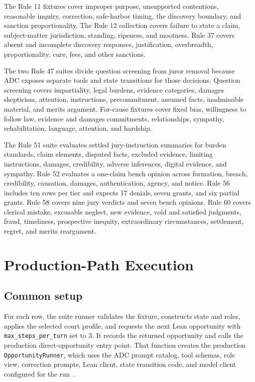 \documentclass[11pt]{article}
\newcommand{\code}[1]{\texttt{#1}}
\begin{document}
The Rule 11 fixtures cover improper purpose, unsupported contentions, reasonable inquiry, correction, safe-harbor timing, the discovery boundary, and sanction proportionality.  The Rule 12 collection covers failure to state a claim, subject-matter jurisdiction, standing, ripeness, and mootness.  Rule 37 covers absent and incomplete discovery responses, justification, overbreadth, proportionality, cure, fees, and other sanctions.

The two Rule 47 suites divide question screening from juror removal because ADC exposes separate tools and state transitions for those decisions.  Question screening covers impartiality, legal burdens, evidence categories, damages skepticism, attention, instructions, precommitment, assumed facts, inadmissible material, and merits argument.  For-cause fixtures cover fixed bias, willingness to follow law, evidence and damages commitments, relationships, sympathy, rehabilitation, language, attention, and hardship.

The Rule 51 suite evaluates settled jury-instruction summaries for burden standards, claim elements, disputed facts, excluded evidence, limiting instructions, damages, credibility, adverse inferences, digital evidence, and sympathy.  Rule 52 evaluates a one-claim bench opinion across formation, breach, credibility, causation, damages, authentication, agency, and notice.  Rule 56 includes ten rows per tier and expects 17 denials, seven grants, and six partial grants.  Rule 58 covers nine jury verdicts and seven bench opinions.  Rule 60 covers clerical mistake, excusable neglect, new evidence, void and satisfied judgments, fraud, timeliness, prospective inequity, extraordinary circumstances, settlement, regret, and merits reargument.

\section{Production-Path Execution}

\subsection{Common setup}

For each row, the suite runner validates the fixture, constructs state and roles, applies the selected court profile, and requests the next Lean opportunity with \code{max\_steps\_per\_turn} set to 3.  It records the returned opportunity and calls the production direct-opportunity entry point.  That function creates the production \code{OpportunityRunner}, which uses the ADC prompt catalog, tool schemas, role view, correction prompts, Lean client, state transition code, and model client configured for the run~\cite{runtime}.
\end{document}
